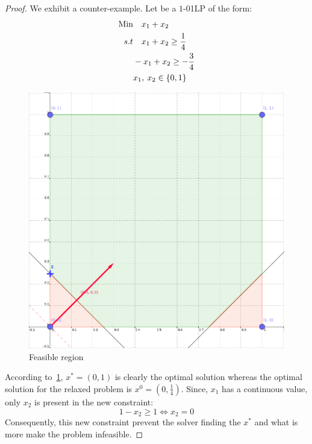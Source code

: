 \begin{proof}
    We exhibit a counter-example. Let be a $1$-01LP of the form:
    \begin{align}
        \text{Min}  & \quad x_1 + x_2\\
        s.t & \quad x_1 + x_ 2 \geq \frac{1}{4}\\
        & -x_1 + x_2 \geq -\frac{3}{4}\\
        & x_1, \: x_2 \in \left\lbrace 0,1 \right\rbrace
    \end{align} 
    \begin{figure}\label{fig:counterExampleL}
        \centering
        \includegraphics[scale=0.4]{figures_tikz/counterExampleL.png}
        \caption{Feasible region}
    \end{figure}
    According to~\ref*{fig:counterExampleL}, $x^* = \left(0,1\right)$ is clearly the optimal solution whereas 
    the optimal solution for the relaxed problem is $x^0 = \left( 0, \frac{1}{4}\right)$.
    Since, $x_1$ has a continuous value, only $x_2$ is present in the new constraint:
    \begin{equation}
        1-x_2 \geq 1 \Leftrightarrow x_2 = 0
    \end{equation}
    Consequently, this new constraint prevent the solver finding the $x^*$ and what is more make the problem infeasible.
\end{proof}
